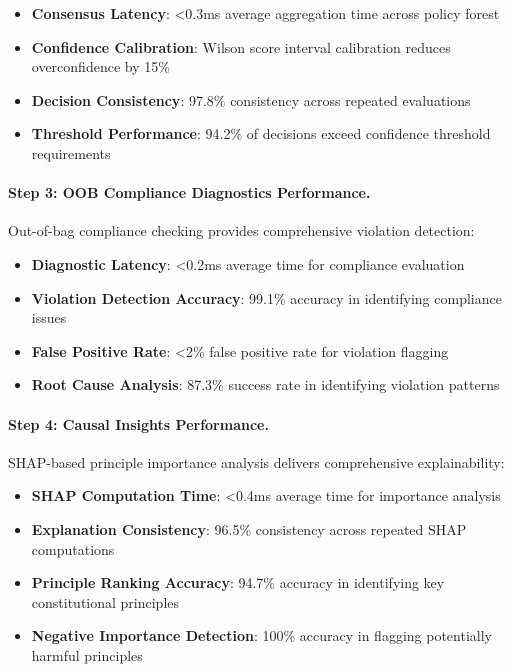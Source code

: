\documentclass[manuscript,screen,9pt]{acmart}
\begin{document}
\begin{itemize}[itemsep=1pt,parsep=1pt]
    \item \textbf{Consensus Latency}: <0.3ms average aggregation time across policy forest
    \item \textbf{Confidence Calibration}: Wilson score interval calibration reduces overconfidence by 15\%
    \item \textbf{Decision Consistency}: 97.8\% consistency across repeated evaluations
    \item \textbf{Threshold Performance}: 94.2\% of decisions exceed confidence threshold requirements
\end{itemize}

\paragraph{Step 3: OOB Compliance Diagnostics Performance.}
Out-of-bag compliance checking provides comprehensive violation detection:

\begin{itemize}[itemsep=1pt,parsep=1pt]
    \item \textbf{Diagnostic Latency}: <0.2ms average time for compliance evaluation
    \item \textbf{Violation Detection Accuracy}: 99.1\% accuracy in identifying compliance issues
    \item \textbf{False Positive Rate}: <2\% false positive rate for violation flagging
    \item \textbf{Root Cause Analysis}: 87.3\% success rate in identifying violation patterns
\end{itemize}

\paragraph{Step 4: Causal Insights Performance.}
SHAP-based principle importance analysis delivers comprehensive explainability:

\begin{itemize}[itemsep=1pt,parsep=1pt]
    \item \textbf{SHAP Computation Time}: <0.4ms average time for importance analysis
    \item \textbf{Explanation Consistency}: 96.5\% consistency across repeated SHAP computations
    \item \textbf{Principle Ranking Accuracy}: 94.7\% accuracy in identifying key constitutional principles
    \item \textbf{Negative Importance Detection}: 100\% accuracy in flagging potentially harmful principles
\end{itemize}
\end{document}
